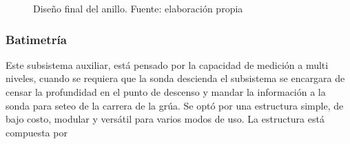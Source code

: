 \begin{itemize}
    \begin{figure}[h]
    \centering
    \caption{Dise\~no final del anillo. Fuente: elaboración propia}
    \label{fig:Anillo2019}
    \end{figure}
\end{itemize}

\subsubsection[Batimetr\'ia]{Batimetr\'ia}
Este subsistema auxiliar, está pensado por la capacidad de medici\'on a multi niveles, cuando se requiera que la sonda descienda el subsistema se encargara de censar la profundidad en el punto de descenso y mandar la informaci\'on a la sonda para seteo de la carrera de la gr\'ua. Se opt\'o por una estructura simple, de bajo costo,  modular y vers\'atil para varios modos de uso.  
La estructura est\'a compuesta por

